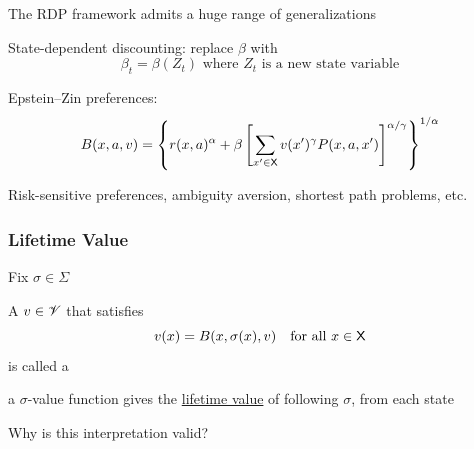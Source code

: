 \begin{frame}
    
    The RDP framework admits a huge range of generalizations

              \vspace{0.5em}
              \vspace{0.5em}
    \Eg State-dependent discounting: replace $\beta$ with 
    \begin{equation*}
        \beta_t = \beta(Z_t)  \text{ where $Z_t$ is a new state variable}
    \end{equation*}

              \vspace{0.5em}
              \vspace{0.5em}
    \Eg Epstein--Zin preferences:
    \begin{equation*}
        B(x, a, v) =
        \left\{
            r(x, a)^\alpha + \beta 
                \left[
                    \sum_{x' \in \mathsf X} v(x')^\gamma P(x,a, x')
                \right]^{\alpha / \gamma}
        \right\}^{1/\alpha}
    \end{equation*}

              \vspace{0.5em}
    \Eg Risk-sensitive preferences, ambiguity aversion, shortest path problems, etc.
     
\end{frame}


\begin{frame}
    \frametitle{Lifetime Value}

    Fix $\sigma \in \Sigma$ 

              \vspace{0.5em}
              \vspace{0.5em}
    A $v \in \mathscr V$ that satisfies
    \begin{equation*}
        v(x) = B(x, \sigma(x), v)
        \quad \text{for all } x \in \mathsf X
    \end{equation*}
    is called a 

              \vspace{0.5em}
              \vspace{0.5em}
     a $\sigma$-value function gives the \underline{lifetime
    value} of following $\sigma$, from each state

              \vspace{0.5em}
              \vspace{0.5em}

    Why is this interpretation valid?

\end{frame}

